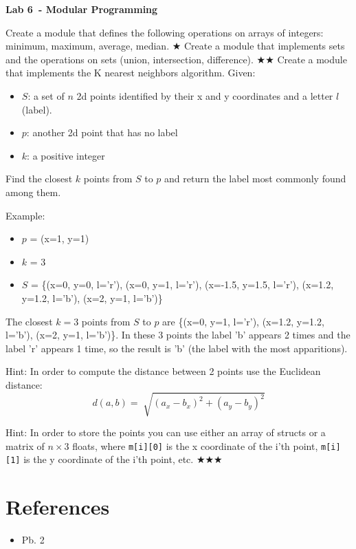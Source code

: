 \documentclass{exam}
\newcommand\labnr{6}
\newcommand\lab{Lab \labnr\ - Modular Programming}
\newcommand\lvlez{$\bigstar$}
\newcommand\lvlmed{\lvlez\lvlez}
\newcommand\lvlhard{\lvlmed\lvlez}
\begin{document}
\begin{center}
   \vspace*{0cm}
   \bfseries\LARGE
   \lab
   \vspace*{1cm}
\end{center}

\begin{questions}   
   \question Create a module that defines the following operations on arrays of integers: minimum, maximum, average, median. \lvlez
   \question Create a module that implements sets and the operations on sets (union, intersection, difference). \lvlmed
   \question Create a module that implements the K nearest neighbors algorithm. 
   Given:
   \begin{itemize}
      \item $S$: a set of $n$ 2d points identified by their x and y coordinates and a letter $l$ (label). 
      \item $p$: another 2d point that has no label
      \item $k$: a positive integer
   \end{itemize}

   Find the closest $k$ points from $S$ to $p$ and return the label most commonly found among them. 
   
   Example: \begin{itemize}
      \item $p$ = (x=1, y=1)
      \item $k$ = 3 
      \item $S$ = \{(x=0, y=0, l='r'), (x=0, y=1, l='r'), (x=-1.5, y=1.5, l='r'), (x=1.2, y=1.2, l='b'), (x=2, y=1, l='b')\}
   \end{itemize}
      The closest $k=3$ points from $S$ to $p$ are \{(x=0, y=1, l='r'), (x=1.2, y=1.2, l='b'), (x=2, y=1, l='b')\}. In these 3 points the label 'b' appears 2 times and the label 'r' appears 1 time, so the result is 'b' (the label with the most apparitions).
   
   Hint: In order to compute the distance between 2 points use the Euclidean distance: \[d(a,b)=\sqrt[]{(a_x-b_x)^2+(a_y-b_y)^2}\]

   Hint: In order to store the points you can use either an array of structs or a matrix of $n \times 3$ floats, where \verb|m[i][0]| is the x coordinate of the i'th point, \verb|m[i][1]| is the y coordinate of the i'th point, etc. \lvlhard{}
\end{questions}
\medskip
\section*{References}
\begin{itemize}
   \item Pb. 2 \cite{cplab06}
\end{itemize}
\printbibliography[heading=none]
\end{document}

